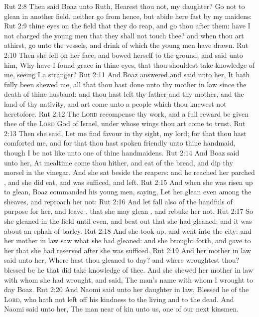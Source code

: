 \vs Rut 2:8 Then said Boaz unto Ruth, Hearest thou not, my daughter? Go not to glean in another field, neither go from hence, but abide here fast by my maidens:
\vs Rut 2:9  thine eyes  on the field that they do reap, and go thou after them: have I not charged the young men that they shall not touch thee? and when thou art athirst, go unto the vessels, and drink of  which the young men have drawn.
\vs Rut 2:10 Then she fell on her face, and bowed herself to the ground, and said unto him, Why have I found grace in thine eyes, that thou shouldest take knowledge of me, seeing I  a stranger?
\vs Rut 2:11 And Boaz answered and said unto her, It hath fully been shewed me, all that thou hast done unto thy mother in law since the death of thine husband: and  thou hast left thy father and thy mother, and the land of thy nativity, and art come unto a people which thou knewest not heretofore.
\vs Rut 2:12 The \textsc{Lord} recompense thy work, and a full reward be given thee of the \textsc{Lord} God of Israel, under whose wings thou art come to trust.
\vs Rut 2:13 Then she said, Let me find favour in thy sight, my lord; for that thou hast comforted me, and for that thou hast spoken friendly unto thine handmaid, though I be not like unto one of thine handmaidens.
\vs Rut 2:14 And Boaz said unto her, At mealtime come thou hither, and eat of the bread, and dip thy morsel in the vinegar. And she sat beside the reapers: and he reached her parched , and she did eat, and was sufficed, and left.
\vs Rut 2:15 And when she was risen up to glean, Boaz commanded his young men, saying, Let her glean even among the sheaves, and reproach her not:
\vs Rut 2:16 And let fall also  of the handfuls of purpose for her, and leave , that she may glean , and rebuke her not.
\vs Rut 2:17 So she gleaned in the field until even, and beat out that she had gleaned: and it was about an ephah of barley.
\vs Rut 2:18 And she took  up, and went into the city: and her mother in law saw what she had gleaned: and she brought forth, and gave to her that she had reserved after she was sufficed.
\vs Rut 2:19 And her mother in law said unto her, Where hast thou gleaned to day? and where wroughtest thou? blessed be he that did take knowledge of thee. And she shewed her mother in law with whom she had wrought, and said, The man's name with whom I wrought to day  Boaz.
\vs Rut 2:20 And Naomi said unto her daughter in law, Blessed  he of the \textsc{Lord}, who hath not left off his kindness to the living and to the dead. And Naomi said unto her, The man  near of kin unto us, one of our next kinsmen.
